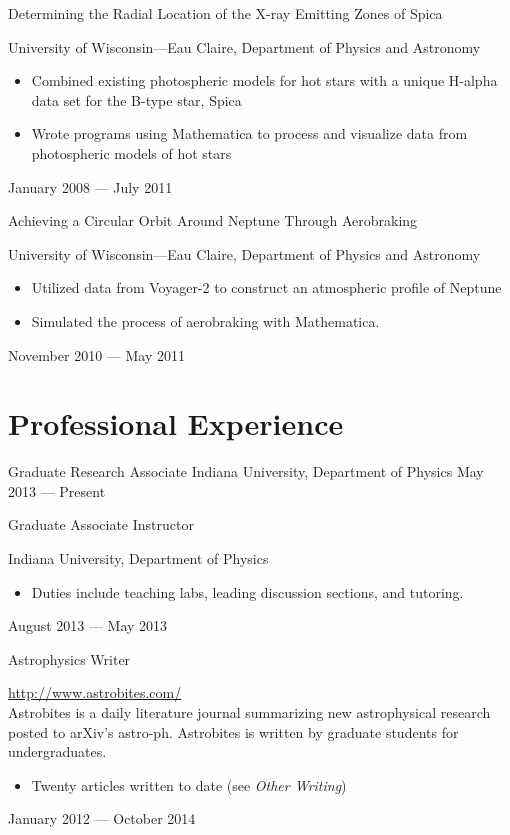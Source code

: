 \documentclass{cv}
\begin{document}
\begin{resume}
\objectLarge
{Determining the Radial Location of the X-ray Emitting}
{Zones of Spica}
{University of Wisconsin---Eau Claire, Department of Physics and Astronomy \noemph
\begin{itemize}
		\item Combined existing photospheric models for hot stars with a unique H-alpha data set for the B-type star, Spica
		\item Wrote programs using Mathematica to process and visualize data from photospheric models of hot stars
	\end{itemize}
 }
{January 2008 --- July 2011}


\objectLarge
{Achieving a Circular Orbit Around Neptune}
{Through Aerobraking}
{University of Wisconsin---Eau Claire, Department of Physics and Astronomy \noemph
\begin{itemize}
		\item Utilized data from Voyager-2 to construct an atmospheric profile of Neptune
		\item Simulated the process of aerobraking with Mathematica.
	\end{itemize}
 }
{November 2010 --- May 2011}



\section{Professional Experience}

\object
{Graduate Research Associate}
{Indiana University, Department of Physics \noemph
 }
{May 2013 --- Present}


\object
{Graduate Associate Instructor}
{Indiana University, Department of Physics \noemph
	\begin{itemize}
		\item Duties include teaching labs, leading discussion sections, and tutoring.
	\end{itemize}
 }
{August 2013 --- May 2013}

\object
{Astrophysics Writer}
{\rm \href{http://astrobites.com/}{http://www.astrobites.com/} \noemph \\
Astrobites is a daily literature journal summarizing new astrophysical research posted to arXiv's astro-ph. Astrobites is written by graduate students for 	undergraduates.
	\begin{itemize}
		\item Twenty articles written to date (see \emph{Other Writing})
	\end{itemize}
 }
{January 2012 --- October 2014}



\end{resume}
\end{document}
